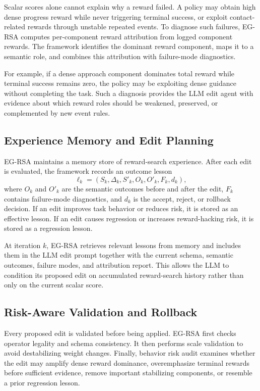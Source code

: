 \documentclass[11pt]{article}
\begin{document}
Scalar scores alone cannot explain why a reward failed. A policy may obtain high dense progress reward while never triggering terminal success, or exploit contact-related rewards through unstable repeated events. To diagnose such failures, EG-RSA computes per-component reward attribution from logged component rewards. The framework identifies the dominant reward component, maps it to a semantic role, and combines this attribution with failure-mode diagnostics.

For example, if a dense approach component dominates total reward while terminal success remains zero, the policy may be exploiting dense guidance without completing the task. Such a diagnosis provides the LLM edit agent with evidence about which reward roles should be weakened, preserved, or complemented by new event rules.

\subsection{Experience Memory and Edit Planning}

EG-RSA maintains a memory store of reward-search experience. After each edit is evaluated, the framework records an outcome lesson
\begin{equation}
\ell_k = (S_k, \Delta_k, S'_k, O_k, O'_k, F_k, d_k),
\end{equation}
where $O_k$ and $O'_k$ are the semantic outcomes before and after the edit, $F_k$ contains failure-mode diagnostics, and $d_k$ is the accept, reject, or rollback decision. If an edit improves task behavior or reduces risk, it is stored as an effective lesson. If an edit causes regression or increases reward-hacking risk, it is stored as a regression lesson.

At iteration $k$, EG-RSA retrieves relevant lessons from memory and includes them in the LLM edit prompt together with the current schema, semantic outcomes, failure modes, and attribution report. This allows the LLM to condition its proposed edit on accumulated reward-search history rather than only on the current scalar score.

\subsection{Risk-Aware Validation and Rollback}

Every proposed edit is validated before being applied. EG-RSA first checks operator legality and schema consistency. It then performs scale validation to avoid destabilizing weight changes. Finally, behavior risk audit examines whether the edit may amplify dense reward dominance, overemphasize terminal rewards before sufficient evidence, remove important stabilizing components, or resemble a prior regression lesson.
\end{document}

